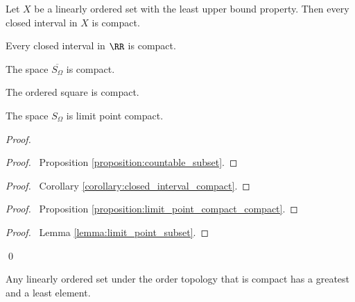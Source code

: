 \begin{corollary}
    \label{corollary:closed_interval_compact}
    Let $X$ be a linearly ordered set with the least upper bound property. Then every closed interval in $X$ is compact.
\end{corollary}

\begin{corollary}
    Every closed interval in $\RR$ is compact.
\end{corollary}

\begin{corollary}
    The space $\overline{S_\Omega}$ is compact.
\end{corollary}

\begin{example}
    The ordered square is compact.
\end{example}

\begin{example}
    The space $S_\Omega$ is limit point compact.

\begin{proof}
    \pf
    \begin{proof}
        \pf\ Proposition \ref{proposition:countable_subset}.
    \end{proof}
    \begin{proof}
        \pf\ Corollary \ref{corollary:closed_interval_compact}.
    \end{proof}
    \begin{proof}
        \pf\ Proposition \ref{proposition:limit_point_compact_compact}.
    \end{proof}
    \begin{proof}
        \pf\ Lemma \ref{lemma:limit_point_subset}.
    \end{proof}
    \qed
\end{proof}
\end{example}

\begin{theorem}
    Any linearly ordered set under the order topology that is compact has
    a greatest and a least element.
\end{theorem}

